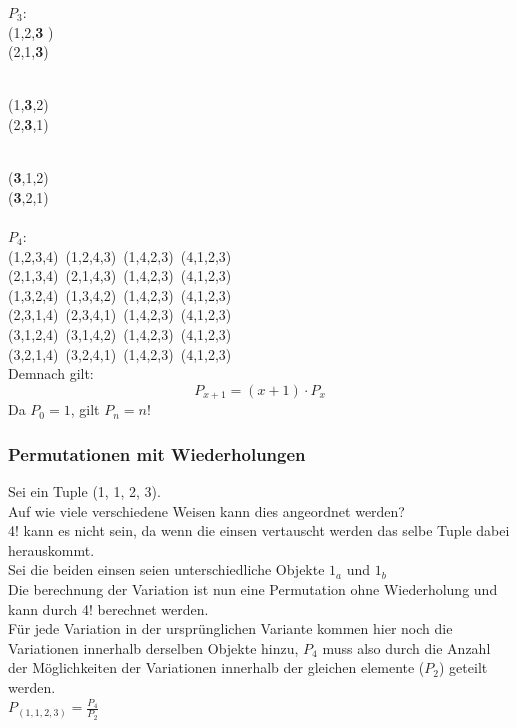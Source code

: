 \documentclass[12pt, letterpaper]{article}
\begin{document}
$P_{3}$:
\\(1,2,\textbf{3}	)
\\(2,1,\textbf{3})

\\(1,\textbf{3},2)
\\(2,\textbf{3},1)

\\(\textbf{3},1,2)
\\(\textbf{3},2,1)
\\\\$P_{4}$:\\
(1,2,3,4)\ (1,2,4,3)\ (1,4,2,3)\ (4,1,2,3)\\
(2,1,3,4)\ (2,1,4,3)\ (1,4,2,3)\ (4,1,2,3)\\
(1,3,2,4)\ (1,3,4,2)\ (1,4,2,3)\ (4,1,2,3)\\
(2,3,1,4)\ (2,3,4,1)\ (1,4,2,3)\ (4,1,2,3)\\
(3,1,2,4)\ (3,1,4,2)\ (1,4,2,3)\ (4,1,2,3)\\
(3,2,1,4)\ (3,2,4,1)\ (1,4,2,3)\ (4,1,2,3)\\

Demnach gilt:
\[	
	P_{x+1} = (x+1)\cdot P_{x}
\]
Da $P_{0} = 1$, gilt $P_{n} = n! $

\subsubsection{Permutationen mit Wiederholungen}
\label{sec:Permutationen mit Wiederholungen}
Sei ein Tuple (1, 1, 2, 3).\\
Auf wie viele verschiedene Weisen kann dies angeordnet werden?\\
4! kann es nicht sein, da wenn die einsen vertauscht werden das selbe Tuple dabei herauskommt.
\\
 
Sei die beiden einsen seien unterschiedliche Objekte $1_{a}$ und $1_{b}$\\
Die berechnung der Variation ist nun eine Permutation ohne Wiederholung und kann durch 4! berechnet werden. \\

Für jede Variation in der ursprünglichen Variante kommen hier noch die Variationen innerhalb derselben Objekte hinzu, $P_{4}$ muss also durch die Anzahl der Möglichkeiten der Variationen innerhalb der gleichen elemente ($P_{2}$) geteilt werden.\\
$P_{(1,1,2,3)}=\frac{P_{4}}{P_{2}}	$
\end{document}
